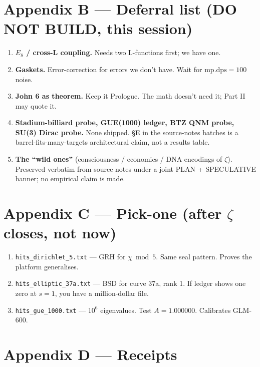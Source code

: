 \documentclass[11pt,letterpaper]{article}
\begin{document}
\section*{Appendix B --- Deferral list (DO NOT BUILD, this session)}

\begin{enumerate}
  \item \textbf{$E_8$ / cross-L coupling.} Needs two L-functions first; we have one.
  \item \textbf{Gaskets.} Error-correction for errors we don't have. Wait for $\mathrm{mp.dps} = 100$ noise.
  \item \textbf{John 6 as theorem.} Keep it Prologue. The math doesn't need it; Part II may quote it.
  \item \textbf{Stadium-billiard probe, GUE(1000) ledger, BTZ QNM probe, SU(3) Dirac probe.} None shipped. \S E in the source-notes batches is a barrel-fits-many-targets architectural claim, not a results table.
  \item \textbf{The ``wild ones''} (consciousness / economics / DNA encodings of $\zeta$). Preserved verbatim from source notes under a joint PLAN + SPECULATIVE banner; no empirical claim is made.
\end{enumerate}

\section*{Appendix C --- Pick-one (after $\zeta$ closes, not now)}

\begin{enumerate}
  \item \texttt{hits\_dirichlet\_5.txt} --- GRH for $\chi \bmod 5$. Same seal pattern. Proves the platform generalises.
  \item \texttt{hits\_elliptic\_37a.txt} --- BSD for curve 37a, rank 1. If ledger shows one zero at $s = 1$, you have a million-dollar file.
  \item \texttt{hits\_gue\_1000.txt} --- $10^6$ eigenvalues. Test $A = 1.000000$. Calibrates GLM-600.
\end{enumerate}

\section*{Appendix D --- Receipts}
\end{document}
